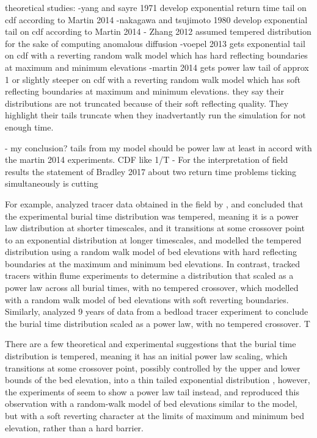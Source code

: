 \documentclass{article}
\begin{document}
theoretical studies: 
-yang and sayre 1971 develop exponential return time tail on cdf according to Martin 2014 
-nakagawa and tsujimoto 1980 develop exponential tail on cdf according to Martin 2014
- Zhang 2012 assumed tempered distribution for the sake of computing anomalous diffusion
-voepel 2013 gets exponential tail on cdf with a reverting random walk model which has hard reflecting boundaries at maximum and minimum elevations
-martin 2014 gets power law tail of approx 1 or slightly steeper on cdf with a reverting random walk model which has soft reflecting boundaries at maximum and   minimum elevations. they say their distributions are not truncated because of their soft reflecting quality. They highlight their tails truncate when they inadvertantly run the simulation for not enough time. 

- my conclusion? tails from my model should be power law at least in accord with the martin 2014 experiments. CDF like 1/T
- For the interpretation of field results the statement of Bradley 2017 about two return time problems ticking simultaneously is cutting 



 For example, \citet{Voepel2013} analyzed tracer data obtained in the field by \citet{Habersack2001}, and concluded that the experimental burial time distribution was tempered, meaning it is a power law distribution at shorter timescales, and it transitions at some crossover point to an exponential distribution at longer timescales, and \citet{Voepel2013} modelled the tempered distribution using a random walk model of bed elevations with hard reflecting boundaries at the maximum and minimum bed elevations.   
In contrast, \citet{Martin2012} tracked tracers within flume experiments to determine a distribution that scaled as a power law across all burial times, with no tempered crossover, which \citet{Martin2014} modelled with a random walk model of bed elevations with soft reverting boundaries. 
Similarly, \citet{Bradley2017} analyzed 9 years of data from a bedload tracer experiment to conclude the burial time distribution scaled as a power law, with no tempered crossover. 
T

There are a few theoretical and experimental suggestions that the burial time distribution is tempered, meaning it has an initial power law scaling, which transitions at some crossover point, possibly controlled by the upper and lower bounds of the bed elevation, into a thin tailed exponential distribution \citep{Zhang2012, Voepel2013, Olinde2015, Bradley2017, Fan2017}, however, the experiments of \citet{Martin2012} seem to show a power law tail instead, and \citet{Martin2014} reproduced this observation with a random-walk model of bed elevations similar to the \citet{Voepel2013} model, but with a soft reverting character at the limits of maximum and minimum bed elevation, rather than a hard barrier. 
\end{document}
